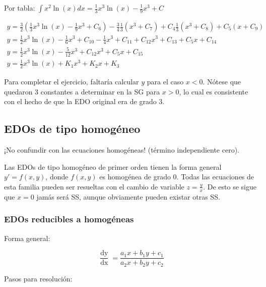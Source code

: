 \documentclass{article}
\begin{document}
Por tabla: $\int x^2 \ln(x) dx = \frac{1}{3} x^3 \ln(x) - \frac{1}{9} x^3 + C$

\begin{gather}
y = \frac{3}{2} \left( \frac{1}{3} x^3 \ln(x) - \frac{1}{9} x^3 + C_6 \right) -\frac{3}{4} \frac{1}{3} (x^3 + C_7) + C_4 \frac{1}{3} (x^3 + C_8) + C_5 (x + C_9) \\
y = \frac{1}{2} x^3 \ln(x) - \frac{1}{6} x^3 + C_{10} - \frac{1}{4} x^3 + C_{11} + C_{12} x^3 + C_{13} + C_5 x + C_{14} \\
y = \frac{1}{2} x^3 \ln(x) - \frac{5}{12} x^3 + C_{12} x^3 + C_5 x + C_{15} \\
y = \frac{1}{2} x^3 \ln(x) + K_1 x^3 + K_2 x + K_3
\end{gather}

Para completar el ejercicio, faltaría calcular $y$ para el caso $x<0$. Nótese que quedaron 3 constantes a determinar en la SG para $x >0$, lo cual es consistente con el hecho de que la EDO original era de grado 3.

\subsection{EDOs de tipo homogéneo}

¡No confundir con las ecuaciones homogéneas! (término independiente cero).

Las EDOs de tipo homogéneo de primer orden tienen la forma general $y' = f(x,y)$, donde $f(x,y)$ es homogénea de grado 0. Todas las ecuaciones de esta familia pueden ser resueltas con el cambio de variable $z = \frac{y}{x}$. De esto se sigue que $x = 0$ jamás será SS, aunque obviamente pueden existar otras SS.

\subsubsection{EDOs reducibles a homogéneas}

Forma general:

\begin{equation}
\frac{\mathop{dy}}{\mathop{dx}} = \frac{a_1 x + b_1 y + c_1}{a_2 x + b_2 y + c_2 }
\end{equation}

Pasos para resolución:
\end{document}

